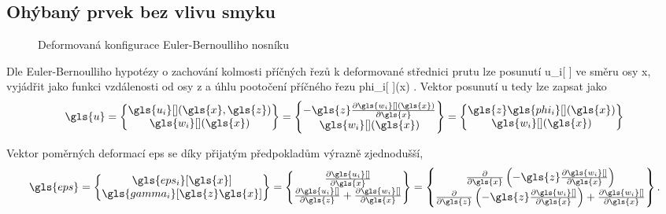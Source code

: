 \subsection{Ohýbaný prvek bez vlivu smyku} \label{sec:EB_beam}

\begin{figure}[H]
    
    \caption{Deformovaná konfigurace Euler-Bernoulliho nosníku}
    \label{fig:deformed_beam}
\end{figure}

Dle Euler-Bernoulliho hypotézy o zachování kolmosti příčných řezů k deformované střednici prutu lze posunutí \gls{u_i}[ ] ve směru osy \gls{x}, vyjádřit jako funkci vzdálenosti od osy \gls{z} a úhlu pootočení příčného řezu \gls{phi_i}[ ](\gls{x}) \cite[58]{ymkp}. Vektor posunutí \gls{u} tedy lze zapsat jako
\begin{equation}
    \gls{u} = 
    \begin{Bmatrix}
        \gls{u_i}[ ](\gls{x}, \gls{z}) \\
        \gls{w_i}[ ](\gls{x})
    \end{Bmatrix}
    =
    \begin{Bmatrix}
        -\gls{z} \pdv{\gls{w_i}[ ](\gls{x})}{\gls{x}} \\
        \gls{w_i}[ ](\gls{x})
    \end{Bmatrix}
    =
    \begin{Bmatrix}
        \gls{z} \gls{phi_i}[ ](\gls{x}) \\
        \gls{w_i}[ ](\gls{x})
    \end{Bmatrix}
\end{equation}

Vektor poměrných deformací \gls{eps} se díky přijatým předpokladům výrazně zjednodušší,
\begin{equation}
    \gls{eps}
    =
    \begin{Bmatrix}
        \gls{eps_i}[\gls{x}] \\
        \gls{gamma_i}[\gls{z}\gls{x}] \\
    \end{Bmatrix}
    =
    \begin{Bmatrix}
        \pdv{\gls{u_i}[ ]}{\gls{x}} \\
        \pdv{\gls{u_i}[ ]}{\gls{z}} + \pdv{\gls{w_i}[ ]}{\gls{x}} \\
    \end{Bmatrix}
    =
    \begin{Bmatrix}
        \pderivative{\gls{x}}\left( -\gls{z} \pdv{\gls{w_i}[ ]}{\gls{x}} \right) \\
        \pderivative{\gls{z}} \left( -\gls{z} \pdv{\gls{w_i}[ ]}{\gls{x}} \right) + \pdv{\gls{w_i}[ ]}{\gls{x}} \\
    \end{Bmatrix}.
\end{equation}


